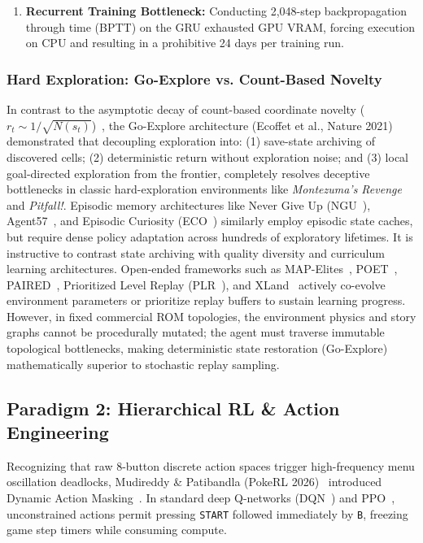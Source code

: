 \documentclass[journal,10pt,twocolumn]{IEEEtran}
\begin{document}
\begin{enumerate}
    \item \textbf{Recurrent Training Bottleneck:} Conducting 2,048-step backpropagation through time (BPTT) on the GRU exhausted GPU VRAM, forcing execution on CPU and resulting in a prohibitive 24 days per training run.
\end{enumerate}

\subsubsection{Hard Exploration: Go-Explore vs. Count-Based Novelty}
In contrast to the asymptotic decay of count-based coordinate novelty ($r_t \sim 1/\sqrt{N(s_t)}$)~\cite{bellemare2016unifying,ostrovski2017count,tang2017exploration}, the Go-Explore architecture (Ecoffet et al., Nature 2021)~\cite{ecoffet2021goexplore,ecoffet2019goexplore_iclr} demonstrated that decoupling exploration into: (1) save-state archiving of discovered cells; (2) deterministic return without exploration noise; and (3) local goal-directed exploration from the frontier, completely resolves deceptive bottlenecks in classic hard-exploration environments like \textit{Montezuma's Revenge} and \textit{Pitfall!}. Episodic memory architectures like Never Give Up (NGU~\cite{badia2020ngu}), Agent57~\cite{badia2020agent57}, and Episodic Curiosity (ECO~\cite{savinov2019episodic}) similarly employ episodic state caches, but require dense policy adaptation across hundreds of exploratory lifetimes. It is instructive to contrast state archiving with quality diversity and curriculum learning architectures. Open-ended frameworks such as MAP-Elites~\cite{mouret2015mapelites}, POET~\cite{wang2019poet}, PAIRED~\cite{dennis2020paired}, Prioritized Level Replay (PLR~\cite{jiang2021plr}), and XLand~\cite{deepmind2021xland} actively co-evolve environment parameters or prioritize replay buffers to sustain learning progress. However, in fixed commercial ROM topologies, the environment physics and story graphs cannot be procedurally mutated; the agent must traverse immutable topological bottlenecks, making deterministic state restoration (Go-Explore) mathematically superior to stochastic replay sampling.

\subsection{Paradigm 2: Hierarchical RL \& Action Engineering}
Recognizing that raw 8-button discrete action spaces trigger high-frequency menu oscillation deadlocks, Mudireddy \& Patibandla (PokeRL 2026)~\cite{mudireddy2026pokerl} introduced Dynamic Action Masking~\cite{huang2022actionmasking}. In standard deep Q-networks (DQN~\cite{mnih2015dqn}) and PPO~\cite{schulman2017ppo}, unconstrained actions permit pressing \texttt{START} followed immediately by \texttt{B}, freezing game step timers while consuming compute.
\end{document}
